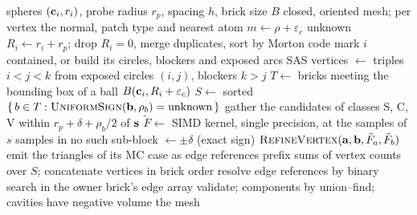 \begin{algorithm}[t]
  \caption{Surface core (\cref{sec:arrangement,sec:lattice,sec:kernel,sec:mc,sec:assembly,sec:cavities}).
    Loops marked \emph{parallel} combine their results in a fixed order, so
    the output does not depend on the number of threads.}
  \label{alg:core}
  \small
  \begin{algorithmic}[1]
    \Require spheres $(\mathbf{c}_i, r_i)$, probe radius $r_p$, spacing $h$, brick size $B$
    \Ensure closed, oriented mesh; per vertex the normal, patch type and nearest atom
      \State $m \gets \rho + \varepsilon_c$
      \State \Return unknown
    \EndFunction
    \Statex
    \State $R_i \gets r_i + r_p$; drop $R_i = 0$, merge duplicates, sort by Morton code
     
      \State mark $i$ contained, or build its circles, blockers and exposed arcs
    \EndFor
    \State SAS vertices $\gets$ triples $i<j<k$ from exposed circles $(i,j)$, blockers $k>j$
    \State $T \gets$ bricks meeting the bounding box of a ball $B(\mathbf{c}_i, R_i + \varepsilon_c)$
    \State $S \gets$ sorted $\{\, b \in T : \Call{UniformSign}{\vect b, \rho_b} = \text{unknown} \,\}$
        \State gather the candidates of classes S, C, V within $r_p + \delta + \rho_b/2$ of $\mathbf{s}$
        \State $\tilde F \gets$ SIMD kernel, single precision, at the samples of $s$
      \EndFor
      \State samples in no such sub-block $\gets \pm\delta$ (exact sign)
        \State $\Call{RefineVertex}{\vect a, \vect b, \tilde F_a, \tilde F_b}$
      \EndFor
        \State emit the triangles of its MC case as edge references
      \EndFor
    \EndFor
    \State prefix sums of vertex counts over $S$; concatenate vertices in brick order
    \State resolve edge references by binary search in the owner brick's edge array
    \State validate; components by union--find; cavities have negative volume
    \State \Return the mesh
  \end{algorithmic}
\end{algorithm}

